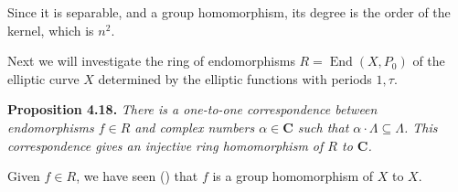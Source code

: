 {\Proof Since it is separable, and a group homomorphism, its degree is the order of the kernel, which is $n^2$.

\smallskip
Next we will investigate the ring of endomorphisms $R=\operatorname{End}(X,P_0)$ of the elliptic curve $X$ determined by the elliptic functions with periods $1,\tau$.

\medskip
\noindent\hypertarget{result-IV-4.18}{}\textbf{Proposition 4.18.} \emph{There is a one-to-one correspondence between endomorphisms $f\in R$ and complex numbers $\alpha\in\mathbf C$ such that $\alpha\cdot\Lambda\subseteq\Lambda$. This correspondence gives an injective ring homomorphism of $R$ to $\mathbf C$.}

\Proof Given $f\in R$, we have seen () that $f$ is a group homomorphism of $X$ to $X$. 
}
